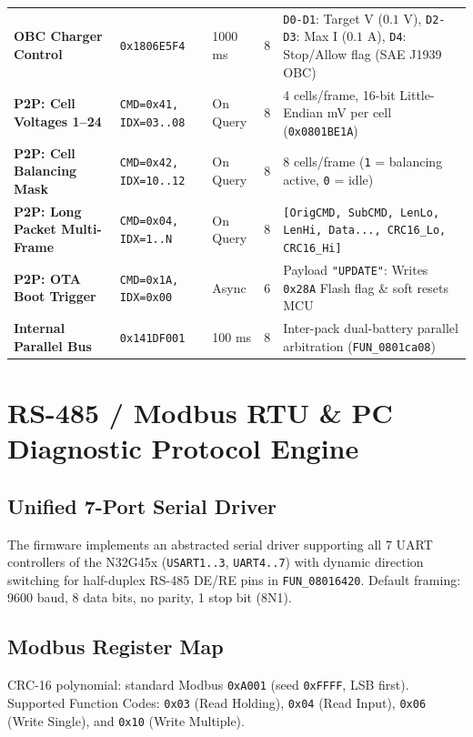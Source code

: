 \documentclass[10pt,a4paper]{article}
\begin{document}
\begin{longtable}{lllcp{7.5cm}}
\textbf{OBC Charger Control} & \texttt{0x1806E5F4} & 1000 ms & 8 & \texttt{D0-D1}: Target V ($0.1\text{ V}$), \texttt{D2-D3}: Max I ($0.1\text{ A}$), \texttt{D4}: Stop/Allow flag (SAE J1939 OBC) \\
\textbf{P2P: Cell Voltages 1--24} & \texttt{CMD=0x41, IDX=03..08} & On Query & 8 & 4 cells/frame, 16-bit Little-Endian mV per cell (\texttt{0x0801BE1A}) \\
\textbf{P2P: Cell Balancing Mask} & \texttt{CMD=0x42, IDX=10..12} & On Query & 8 & 8 cells/frame (\texttt{1} = balancing active, \texttt{0} = idle) \\
\textbf{P2P: Long Packet Multi-Frame} & \texttt{CMD=0x04, IDX=1..N} & On Query & 8 & \texttt{[OrigCMD, SubCMD, LenLo, LenHi, Data..., CRC16\_Lo, CRC16\_Hi]} \\
\textbf{P2P: OTA Boot Trigger} & \texttt{CMD=0x1A, IDX=0x00} & Async & 6 & Payload \texttt{"UPDATE"}: Writes \texttt{0x28A} Flash flag \& soft resets MCU \\
\textbf{Internal Parallel Bus} & \texttt{0x141DF001} & 100 ms & 8 & Inter-pack dual-battery parallel arbitration (\texttt{FUN\_0801ca08}) \\
\end{longtable}

\section{RS-485 / Modbus RTU \& PC Diagnostic Protocol Engine}

\subsection{Unified 7-Port Serial Driver}
The firmware implements an abstracted serial driver supporting all 7 UART controllers of the N32G45x (\texttt{USART1..3}, \texttt{UART4..7}) with dynamic direction switching for half-duplex RS-485 DE/RE pins in \texttt{FUN\_08016420}. Default framing: 9600 baud, 8 data bits, no parity, 1 stop bit (8N1).

\subsection{Modbus Register Map}
CRC-16 polynomial: standard Modbus \texttt{0xA001} (seed \texttt{0xFFFF}, LSB first). Supported Function Codes: \texttt{0x03} (Read Holding), \texttt{0x04} (Read Input), \texttt{0x06} (Write Single), and \texttt{0x10} (Write Multiple).
\end{document}
